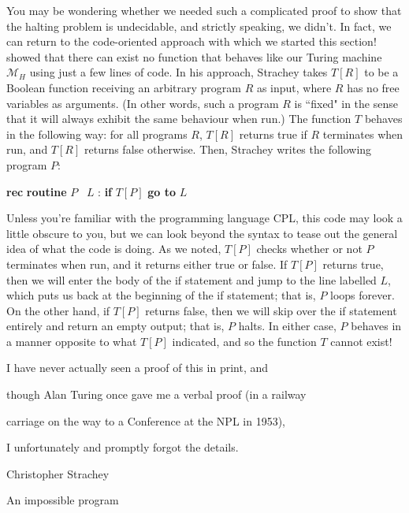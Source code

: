 You may be wondering whether we needed such a complicated proof to show that the halting problem is undecidable, and strictly speaking, we didn't. In fact, we can return to the code-oriented approach with which we started this section! \citet{Strachey1965AnImpossibleProgram} showed that there can exist no function that behaves like our Turing machine $\mathcal{M}_{H}$ using just a few lines of code. In his approach, Strachey takes $T[R]$ to be a Boolean function receiving an arbitrary program $R$ as input, where $R$ has no free variables as arguments. (In other words, such a program $R$ is ``fixed" in the sense that it will always exhibit the same behaviour when run.) The function $T$ behaves in the following way: for all programs $R$, $T[R]$ returns true if $R$ terminates when run, and $T[R]$ returns false otherwise. Then, Strachey writes the following program $P$:
\begin{colouredbox}
\begin{algorithmic}
\State \textbf{rec} \textbf{routine} $P$
\State \hspace{\algorithmicindent}  \ $L$ : \textbf{if} $T[P]$ \textbf{go to} $L$
\State \hspace{\algorithmicindent}\hspace{\algorithmicindent} \Return {}
\end{algorithmic}
\end{colouredbox}
\noindent
Unless you're familiar with the programming language CPL, this code may look a little obscure to you, but we can look beyond the syntax to tease out the general idea of what the code is doing. As we noted, $T[P]$ checks whether or not $P$ terminates when run, and it returns either true or false. If $T[P]$ returns true, then we will enter the body of the if statement and jump to the line labelled $L$, which puts us back at the beginning of the if statement; that is, $P$ loops forever. On the other hand, if $T[P]$ returns false, then we will skip over the if statement entirely and return an empty output; that is, $P$ halts. In either case, $P$ behaves in a manner opposite to what $T[P]$ indicated, and so the function $T$ cannot exist!

\epigraph{I have never actually seen a proof of this in print, and\par
though Alan Turing once gave me a verbal proof (in a railway\par
carriage on the way to a Conference at the NPL in 1953),\par
I unfortunately and promptly forgot the details.}{Christopher Strachey}{An impossible program}{}
